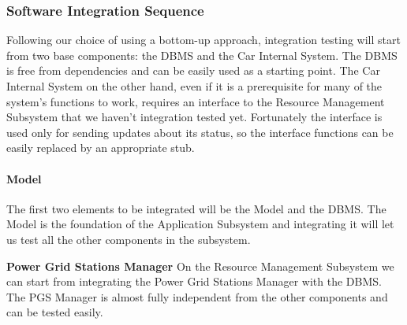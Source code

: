 \documentclass[english]{article}
\begin{document}
\subsubsection{Software Integration Sequence}

Following our choice of using a bottom-up approach, integration testing will start from two base components: the DBMS and the Car Internal System.
The DBMS is free from dependencies and can be easily used as a starting point.
The Car Internal System on the other hand, even if it is a prerequisite for many of the system's functions to work, requires an interface to the Resource Management Subsystem that we haven't integration tested yet. Fortunately the interface is used only for sending updates about its status, so the interface functions can be easily replaced by an appropriate stub.


\paragraph{Model}
The first two elements to be integrated will be the Model and the DBMS.
The Model is the foundation of the Application Subsystem and integrating it will let us test all the other components in the subsystem.

\begin{figure}[H]
	\centering
\end{figure}

\textbf{Power Grid Stations Manager}
On the Resource Management Subsystem we can start from integrating the Power Grid Stations Manager with the DBMS.
The PGS Manager is almost fully independent from the other components and can be tested easily.
\begin{figure}[H]
	\centering
\end{figure}
\end{document}
